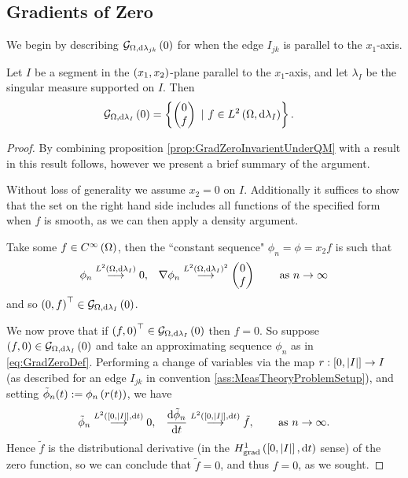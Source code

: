 \subsection{Gradients of Zero} \label{appS:muGradZero}
We begin by describing $\mathcal{G}_{ \Omega, \mathrm{d}\lambda_{jk}}\left( 0 \right)$ for when the edge $I_{jk}$ is parallel to the $x_1$-axis.
\begin{prop} \label{prop:GradZeroParallelZhikov}
	Let $I$ be a segment in the $\left( x_1,x_2 \right)$-plane parallel to the $x_1$-axis, and let $\lambda_I$ be the singular measure supported on $I$.
	Then 
	\begin{align*}
		\mathcal{G}_{ \Omega, \mathrm{d}\lambda_I}\left( 0 \right) &= 
		\left\{ 
			\begin{pmatrix} 0 \\ f	\end{pmatrix}
			\ \vert \ f\in L^{2}\left( \Omega,\mathrm{d}\lambda_I \right)
		 \right\}.
	\end{align*}
\end{prop}
\begin{proof}
	By combining proposition \ref{prop:GradZeroInvarientUnderQM} with a result in \cite[Section~3.1]{zhikov2000extension} this result follows, however we present a brief summary of the argument. \newline
	
	Without loss of generality we assume $x_2=0$ on $I$.
	Additionally it suffices to show that the set on the right hand side includes all functions of the specified form when $f$ is smooth, as we can then apply a density argument. \newline
	
	Take some $f\in C^{\infty}\left( \Omega \right)$, then the ``constant sequence" $\phi_n = \phi = x_2 f$ is such that
	\begin{align*}
		\phi_n\overset{L^{2}\left( \Omega,\mathrm{d}\lambda_I \right)}{\longrightarrow}0, 
		&\quad \nabla\phi_n\overset{L^{2}\left( \Omega,\mathrm{d}\lambda_I \right)^2}{\longrightarrow} \begin{pmatrix} 0 \\ f \end{pmatrix}
		&\quad \ \text{as} \ n \rightarrow\infty
	\end{align*}	 
	and so $\left( 0,f \right)^\top\in\mathcal{G}_{ \Omega, \mathrm{d}\lambda_I}\left( 0 \right)$. \newline
	
	We now prove that if $\left( f,0 \right)^\top\in\mathcal{G}_{ \Omega, \mathrm{d}\lambda_I}\left( 0 \right)$ then $f=0$.
	So suppose $\left( f,0 \right)\in\mathcal{G}_{ \Omega, \mathrm{d}\lambda_I}\left( 0 \right)$ and take an approximating sequence $\phi_n$ as in \eqref{eq:GradZeroDef}.
	Performing a change of variables via the map $r:\left[ 0,\left\lvert I \right\rvert \right]\rightarrow I$ (as described for an edge $I_{jk}$ in convention \ref{ass:MeasTheoryProblemSetup}), and setting $\tilde{\phi}_n(t) := \phi_n\left( r(t) \right)$, we have
	\begin{align*}
		\tilde{\phi}_n\overset{L^{2}\left( \left[ 0,\left\lvert I \right\rvert \right],\mathrm{d}t \right)}{\longrightarrow} 0, 
		&\quad \dfrac{\mathrm{d}\tilde{\phi}_n}{\mathrm{d}t}\overset{L^{2}\left( \left[ 0,\left\lvert I \right\rvert \right],\mathrm{d}t \right)}{\longrightarrow} \tilde{f},
		&\quad \ \text{as} \ n \rightarrow\infty.
	\end{align*}
	Hence $\tilde{f}$ is the distributional derivative (in the $H^1_\mathrm{grad}\left( \left[ 0,\left\lvert I \right\rvert \right], \mathrm{d}t \right)$ sense) of the zero function, so we can conclude that $\tilde{f} = 0$, and thus $f = 0$, as we sought.
\end{proof}


